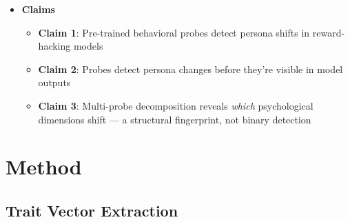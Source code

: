 \documentclass[11pt]{article}
\begin{document}
\begin{itemize}
  \item \textbf{Claims}
  \begin{itemize}
    \item \textbf{Claim 1}: Pre-trained behavioral probes detect persona shifts in reward-hacking models
    \item \textbf{Claim 2}: Probes detect persona changes before they're visible in model outputs
    \item \textbf{Claim 3}: Multi-probe decomposition reveals \emph{which} psychological dimensions shift --- a structural fingerprint, not binary detection
  \end{itemize}
\end{itemize}


\section{Method}

\subsection{Trait Vector Extraction}
\end{document}

